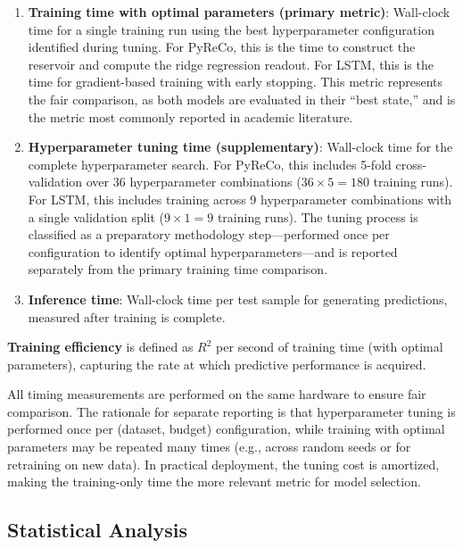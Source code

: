 \begin{enumerate}
    \item \textbf{Training time with optimal parameters (primary metric)}: Wall-clock time for a single training run using the best hyperparameter configuration identified during tuning. For PyReCo, this is the time to construct the reservoir and compute the ridge regression readout. For LSTM, this is the time for gradient-based training with early stopping. This metric represents the fair comparison, as both models are evaluated in their ``best state,'' and is the metric most commonly reported in academic literature.

    \item \textbf{Hyperparameter tuning time (supplementary)}: Wall-clock time for the complete hyperparameter search. For PyReCo, this includes 5-fold cross-validation over 36 hyperparameter combinations ($36 \times 5 = 180$ training runs). For LSTM, this includes training across 9 hyperparameter combinations with a single validation split ($9 \times 1 = 9$ training runs). The tuning process is classified as a preparatory methodology step---performed once per configuration to identify optimal hyperparameters---and is reported separately from the primary training time comparison.

    \item \textbf{Inference time}: Wall-clock time per test sample for generating predictions, measured after training is complete.
\end{enumerate}

\textbf{Training efficiency} is defined as $R^2$ per second of training time (with optimal parameters), capturing the rate at which predictive performance is acquired.

All timing measurements are performed on the same hardware to ensure fair comparison. The rationale for separate reporting is that hyperparameter tuning is performed once per (dataset, budget) configuration, while training with optimal parameters may be repeated many times (e.g., across random seeds or for retraining on new data). In practical deployment, the tuning cost is amortized, making the training-only time the more relevant metric for model selection.

\subsection{Statistical Analysis}
\label{sec:stat_methods}

